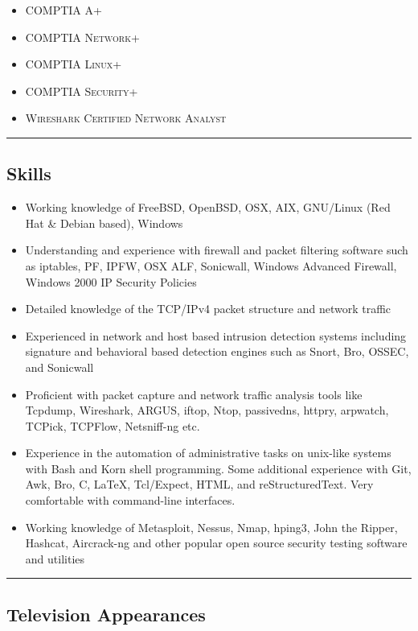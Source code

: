 \documentclass[10pt,letterpaper]{article}
\begin{document}
\begin{itemize}
	\parskip=0.1em

	\item \textsc{COMPTIA A+}
	\item \textsc{COMPTIA Network+}
	\item \textsc{COMPTIA Linux+}
	\item \textsc{COMPTIA Security+}
	\item \textsc{Wireshark Certified Network Analyst}
\end{itemize}

\hrule
\vspace{-0.4em}
\subsection*{Skills}

\begin{itemize}
	\parskip=0.1em

	\item Working knowledge of FreeBSD, OpenBSD, OSX, AIX, GNU/Linux (Red Hat \& Debian based), Windows
	\item Understanding and experience with firewall and packet filtering software such as iptables, PF, IPFW, OSX ALF, Sonicwall, Windows Advanced Firewall, Windows 2000 IP Security Policies
	\item Detailed knowledge of the TCP/IPv4 packet structure and network traffic
	\item Experienced in network and host based intrusion detection systems
including signature and behavioral based detection engines such as Snort, Bro, OSSEC, and Sonicwall
	\item Proficient with packet capture and network traffic analysis tools like Tcpdump, Wireshark, ARGUS, iftop, Ntop, passivedns, httpry, arpwatch, TCPick, TCPFlow, Netsniff-ng etc.
	\item Experience in the automation of administrative tasks on unix-like
systems with Bash and Korn shell programming. Some additional experience with Git, Awk, Bro, C, \LaTeX, Tcl/Expect, HTML, and reStructuredText. Very comfortable with command-line interfaces.
	\item Working knowledge of Metasploit, Nessus, Nmap, hping3, John the Ripper, Hashcat, Aircrack-ng and other popular open source security testing software and utilities
\end{itemize}

\hrule
\vspace{-0.4em}
\subsection*{Television Appearances}
\end{document}
